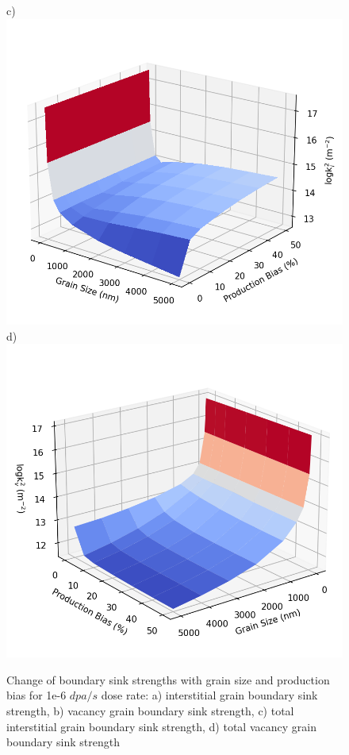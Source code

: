 \documentclass[utf8]{frontiersSCNS} %
\begin{document}
\begin{figure}[h!]
        c)\includegraphics[scale=0.55]{Fig12_c}
        d)\includegraphics[scale=0.55]{Fig12_d}
        \caption{Change of boundary sink strengths with grain size and production bias for 1e-6 $dpa/s$ dose rate: a) interstitial grain boundary sink strength, b) vacancy grain boundary sink strength, c) total interstitial grain boundary sink strength, d) total vacancy grain boundary sink strength}
        \label{figure:sink_strength_moose_neutron_3D}
     \end{figure}
\end{document}
